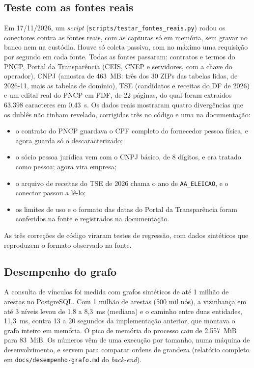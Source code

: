 \subsection{Teste com as fontes reais}
\label{sec:desenv-fontes-reais}

Em 17/11/2026, um \textit{script}
(\texttt{scripts/testar\_fontes\_reais.py}) rodou os conectores contra as
fontes reais, com as capturas só em memória, sem gravar no banco nem na
custódia. Houve só coleta passiva, com no máximo uma requisição por segundo
em cada fonte. Todas as fontes passaram: contratos e termos do PNCP, Portal
da Transparência (CEIS, CNEP e servidores, com a chave do operador), CNPJ
(amostra de 463~MB: três dos 30 ZIPs das tabelas lidas, de 2026-11, mais as
tabelas de domínio), TSE (candidatos e receitas do DF de
2026) e um edital real do PNCP em PDF, de 22 páginas, do qual foram
extraídos 63.398 caracteres em 0,43~s. Os dados reais mostraram quatro
divergências que os dublês não tinham revelado, corrigidas três no código e
uma na documentação:
\begin{itemize}
	\item o contrato do PNCP guardava o CPF completo do fornecedor pessoa
	física, e agora guarda só o descaracterizado;
	\item o sócio pessoa jurídica vem com o CNPJ básico, de 8 dígitos, e era
	tratado como pessoa; agora vira empresa;
	\item o arquivo de receitas do TSE de 2026 chama o ano de
	\texttt{AA\_ELEICAO}, e o conector passou a lê-lo;
	\item os limites de uso e o formato das datas do Portal da Transparência
	foram conferidos na fonte e registrados na documentação.
\end{itemize}
As três correções de código viraram testes de regressão, com dados
sintéticos que reproduzem o formato observado na fonte.

\subsection{Desempenho do grafo}
\label{sec:desenv-desempenho}

A consulta de vínculos foi medida com grafos
sintéticos de até 1 milhão de arestas no PostgreSQL. Com 1 milhão de arestas
(500 mil nós), a vizinhança em até 3 níveis levou de 1,8 a 8,3~ms (mediana) e
o caminho entre duas entidades, 11,3~ms, contra 13 a 20 segundos da
implementação anterior, que montava o grafo inteiro em memória. O pico de
memória do processo caiu de 2.557~MiB para 83~MiB. Os números vêm de uma
execução por tamanho, numa máquina de desenvolvimento, e servem para comparar
ordens de grandeza (relatório completo em \texttt{docs/desempenho-grafo.md}
do \textit{back-end}).

